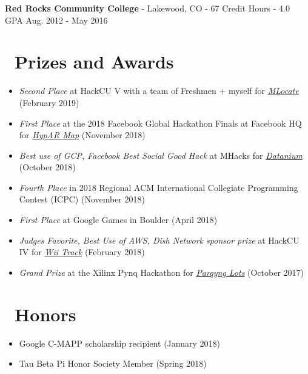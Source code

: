 \documentclass[10pt,letterpaper]{article}
\begin{document}
\vspace{2pt}
\textbf{Red Rocks Community College} - Lakewood, CO - 67 Credit Hours - 4.0 GPA
\hfill Aug. 2012 - May 2016

\section*{\faTrophy\ Prizes and Awards}
\begin{itemize}
    \item \textit{Second Place} at HackCU V with a team of Freshmen + myself
        for
        \href{https://sumnerevans.com/pages/portfolio.html#MLocate}{\textit{MLocate}}
        (February 2019)
    \item \textit{First Place} at the 2018 Facebook Global Hackathon Finals at
        Facebook HQ for
        \href{https://sumnerevans.com/pages/portfolio.html#HypAR-Map}{\textit{HypAR Map}}
        (November 2018)
    \item \textit{Best use of GCP, Facebook Best Social Good Hack} at MHacks for
        \href{https://sumnerevans.com/pages/portfolio.html#Datanium}{\textit{Datanium}}
        (October 2018)
    \item \textit{Fourth Place} in 2018 Regional ACM International Collegiate
        Programming Contest (ICPC) (November 2018)
    \item \textit{First Place} at Google Games in Boulder (April 2018)
    \item \textit{Judges Favorite, Best Use of AWS, Dish Network sponsor prize}
        at HackCU IV for
        \href{https://sumnerevans.com/pages/portfolio.html#Wii-Track}{\textit{Wii Track}}
        (February 2018)
    \item \textit{Grand Prize} at the Xilinx Pynq Hackathon for
        \href{https://sumnerevans.com/pages/portfolio.html#Parqyng-Lots}{\textit{Parqyng Lots}}
        (October 2017)
\end{itemize}

\section*{\faStar\ Honors}
\begin{itemize}
    \item Google C-MAPP scholarship recipient (January 2018)
    \item Tau Beta Pi Honor Society Member (Spring 2018)
\end{itemize}

\newpage
\end{document}

